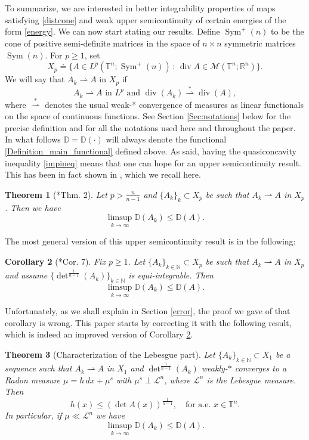 \documentclass[10pt,reqno]{amsart}
\numberwithin{equation}{section}
\newcommand{\R}{\mathbb{R}}
\newcommand{\T}{\mathbb{T}}
\newcommand{\N}{\mathbb{N}}
\newcommand{\D}{\mathbb{D}}
\DeclareMathOperator{\dv}{div}
\DeclareMathOperator{\Sym}{Sym}
\theoremstyle{plain}
\newtheorem{Teo}{Theorem}[section]
\newtheorem{Cor}[Teo]{Corollary}
\theoremstyle{definition}
\theoremstyle{remark}
\begin{document}
\\
\\
To summarize, we are interested in better integrability properties of maps satisfying \eqref{distcone} and weak upper semicontinuity of certain energies of the form \eqref{energy}. We can now start stating our results. Define $\Sym^+(n)$ to be the cone of  positive semi-definite matrices in the space of $n\times n$ symmetric matrices $\Sym(n)$. For $p \ge 1$, set
\[
X_p\doteq\{ A\in L^p(\T^n;\Sym^+(n)) \, : \, \dv A\in \mathcal{M}(\T^n;\R^n)\}.
\]
We will say that $A_k\rightharpoonup A$ in $X_p$ if
\[
A_k \rightharpoonup A \text{ in }L^p \text{ and } \dv(A_k) \overset{*}{\rightharpoonup} \dv(A),
\] 
where $\overset{*}{\rightharpoonup}$ denotes the usual weak-* convergence of measures as linear functionals on the space of continuous functions. See Section \ref{Sec:notations} below for the precise definition and for all the notations used here and throughout the paper. In what follows $\D=\D(\cdot)$ will always denote the functional \eqref{Definition_main_functional} defined above. As said, having the quasiconcavity inequality \eqref{impineq} means that one can hope for an upper semicontinuity result. This has been in fact shown in \cite{USC}, which we recall here.
\begin{Teo}[\cite{USC}*{Thm. 2}]\label{t:usc_supercritical}
Let $p > \frac{n}{n - 1}$ and $\{A_k\}_k\subset X_p$ be such that $A_k \rightharpoonup A$ in $X_p$. Then we have
\[
\limsup_{k\to \infty} \D (A_k)\leq \D(A).
\]
\end{Teo}
The most general version of this upper semicontinuity result is in the following:
\begin{Cor}[\cite{USC}*{Cor. 7}]\label{tbc}
Fix $p\geq 1$. Let $\{A_k\}_{k\in \N}\subset X_p$ be such that $A_k\rightharpoonup A$ in $X_p$ and assume $\{\det^{\frac{1}{n - 1}}(A_k)\}_{k \in \N}$ is equi-integrable. Then
\[
\limsup_{k \to \infty}\D(A_k) \le \D(A).
\]
\end{Cor}
Unfortunately, as we shall explain in Section \ref{error}, the proof we gave of that corollary is wrong. This paper starts by correcting it with the following result, which is indeed an improved version of Corollary \ref{tbc}.
\begin{Teo}[Characterization of the Lebesgue part]\label{introleb}
Let $\{A_k\}_{k\in \N}\subset X_1$ be a sequence such that $A_k\rightharpoonup A$ in $X_1$ and $\det ^{\frac{1}{n-1}} (A_k)$ weakly-$*$ converges to a Radon measure $\mu=h\,dx+\mu^s$ with $\mu^s \perp \mathcal{L}^n$, where $\mathcal{L}^n$ is the Lebesgue measure. Then
\begin{equation}\label{hest}
h(x) \leq \left(\det A(x)\right)^\frac{1}{n-1},\quad \text{for a.e. }x\in \T^n.
\end{equation}
In particular, if $\mu \ll \mathcal{L}^n$ we have
$$
\limsup_{k\rightarrow \infty} \mathbb{D} (A_k)\leq \mathbb{D} (A).
$$
\end{Teo}
\end{document}
